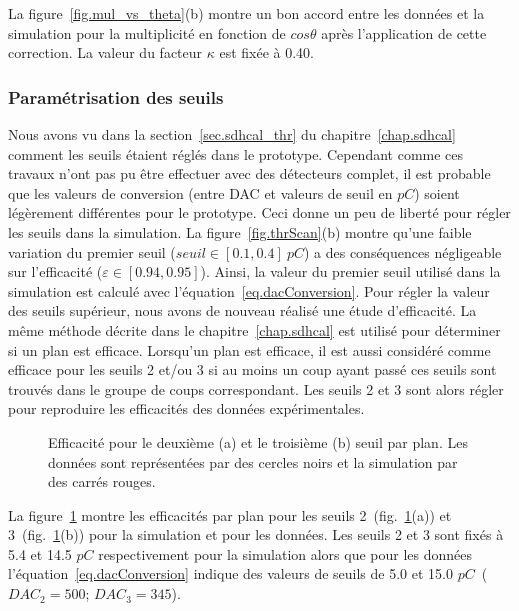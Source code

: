 La figure~\ref{fig.mul_vs_theta}(b) montre un bon accord entre les données et la simulation pour la multiplicité en fonction de $cos\theta$ après l'application de cette correction. La valeur du facteur $\kappa$ est fixée à 0.40.


\subsubsection{Paramétrisation des seuils}
Nous avons vu dans la section~\ref{sec.sdhcal_thr} du chapitre~\ref{chap.sdhcal} comment les seuils étaient réglés dans le prototype. Cependant comme ces travaux n'ont pas pu être effectuer avec des détecteurs complet, il est probable que les valeurs de conversion (entre DAC et valeurs de seuil en $pC$) soient légèrement différentes pour le prototype. Ceci donne un peu de liberté pour régler les seuils dans la simulation. La figure~\ref{fig.thrScan}(b) montre qu'une faible variation du premier seuil ($seuil\in[0.1,0.4]~pC$) a des conséquences négligeable sur l'efficacité ($\varepsilon\in[0.94,0.95]$). Ainsi, la valeur du premier seuil utilisé dans la simulation est calculé avec l'équation~\ref{eq.dacConversion}. Pour régler la valeur des seuils supérieur, nous avons de nouveau réalisé une étude d'efficacité. La même méthode décrite dans le chapitre~\ref{chap.sdhcal} est utilisé pour déterminer si un plan est efficace. Lorsqu'un plan est efficace, il est aussi considéré comme efficace pour les seuils 2 et/ou 3 si au moins un coup ayant passé ces seuils sont trouvés dans le groupe de coups correspondant. Les seuils 2 et 3 sont alors régler pour reproduire les efficacités des données expérimentales. 
\begin{figure}[!ht]
  \caption{Efficacité pour le deuxième (a) et le troisième (b) seuil par plan. Les données sont représentées par des cercles noirs et la simulation par des carrés rouges.\label{fig.eff_thr}}
\end{figure}
La figure~\ref{fig.eff_thr} montre les efficacités par plan pour les seuils 2~(fig.~\ref{fig.eff_thr}(a)) et 3~(fig.~\ref{fig.eff_thr}(b)) pour la simulation et pour les données. Les seuils 2 et 3 sont fixés à 5.4 et 14.5 $pC$ respectivement pour la simulation alors que pour les données l'équation~\ref{eq.dacConversion} indique des valeurs de seuils de 5.0 et 15.0 $pC$~($DAC_2=500$; $DAC_3=345$).

